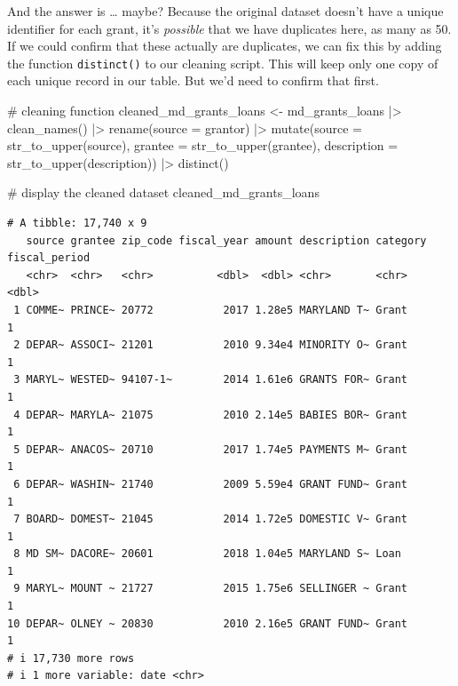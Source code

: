 \documentclass[
  letterpaper,
  DIV=11,
  numbers=noendperiod]{scrreprt}
\newenvironment{Shaded}{\begin{snugshade}}{\end{snugshade}}
\newcommand{\AttributeTok}[1]{\textcolor[rgb]{0.40,0.45,0.13}{#1}}
\newcommand{\CommentTok}[1]{\textcolor[rgb]{0.37,0.37,0.37}{#1}}
\newcommand{\FunctionTok}[1]{\textcolor[rgb]{0.28,0.35,0.67}{#1}}
\newcommand{\NormalTok}[1]{\textcolor[rgb]{0.00,0.23,0.31}{#1}}
\newcommand{\OtherTok}[1]{\textcolor[rgb]{0.00,0.23,0.31}{#1}}
\newcommand{\SpecialCharTok}[1]{\textcolor[rgb]{0.37,0.37,0.37}{#1}}
\begin{document}
And the answer is \ldots{} maybe? Because the original dataset doesn't
have a unique identifier for each grant, it's \emph{possible} that we
have duplicates here, as many as 50. If we could confirm that these
actually are duplicates, we can fix this by adding the function
\texttt{distinct()} to our cleaning script. This will keep only one copy
of each unique record in our table. But we'd need to confirm that first.

\begin{Shaded}
\begin{Highlighting}[]
\CommentTok{\# cleaning function}
\NormalTok{cleaned\_md\_grants\_loans }\OtherTok{\textless{}{-}}\NormalTok{ md\_grants\_loans }\SpecialCharTok{|\textgreater{}}
  \FunctionTok{clean\_names}\NormalTok{() }\SpecialCharTok{|\textgreater{}} 
  \FunctionTok{rename}\NormalTok{(}\AttributeTok{source =}\NormalTok{ grantor) }\SpecialCharTok{|\textgreater{}} 
  \FunctionTok{mutate}\NormalTok{(}\AttributeTok{source =} \FunctionTok{str\_to\_upper}\NormalTok{(source), }\AttributeTok{grantee =} \FunctionTok{str\_to\_upper}\NormalTok{(grantee), }\AttributeTok{description =} \FunctionTok{str\_to\_upper}\NormalTok{(description)) }\SpecialCharTok{|\textgreater{}} 
  \FunctionTok{distinct}\NormalTok{()}

\CommentTok{\# display the cleaned dataset}
\NormalTok{cleaned\_md\_grants\_loans}
\end{Highlighting}
\end{Shaded}

\begin{verbatim}
# A tibble: 17,740 x 9
   source grantee zip_code fiscal_year amount description category fiscal_period
   <chr>  <chr>   <chr>          <dbl>  <dbl> <chr>       <chr>            <dbl>
 1 COMME~ PRINCE~ 20772           2017 1.28e5 MARYLAND T~ Grant                1
 2 DEPAR~ ASSOCI~ 21201           2010 9.34e4 MINORITY O~ Grant                1
 3 MARYL~ WESTED~ 94107-1~        2014 1.61e6 GRANTS FOR~ Grant                1
 4 DEPAR~ MARYLA~ 21075           2010 2.14e5 BABIES BOR~ Grant                1
 5 DEPAR~ ANACOS~ 20710           2017 1.74e5 PAYMENTS M~ Grant                1
 6 DEPAR~ WASHIN~ 21740           2009 5.59e4 GRANT FUND~ Grant                1
 7 BOARD~ DOMEST~ 21045           2014 1.72e5 DOMESTIC V~ Grant                1
 8 MD SM~ DACORE~ 20601           2018 1.04e5 MARYLAND S~ Loan                 1
 9 MARYL~ MOUNT ~ 21727           2015 1.75e6 SELLINGER ~ Grant                1
10 DEPAR~ OLNEY ~ 20830           2010 2.16e5 GRANT FUND~ Grant                1
# i 17,730 more rows
# i 1 more variable: date <chr>
\end{verbatim}
\end{document}
